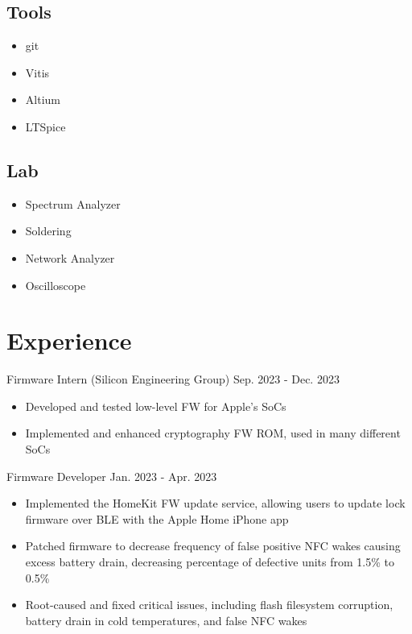 \documentclass[lighthipster]{styles}
\begin{document}
\begin{paracol}{2}
{\subsection*{Tools}
\vspace{-0.2cm}
\begin{multicols}{2}
    \begin{itemize}
        \item git
        \item Vitis
        \item Altium
        \item LTSpice
    \end{itemize}
\end{multicols}

\subsection*{Lab}
\vspace{-0.2cm}
\begin{multicols}{2}[]
    \begin{itemize}
        \item Spectrum Analyzer
        \item Soldering
        \item Network Analyzer
        \item Oscilloscope
    \end{itemize}
\end{multicols}

}
\switchcolumn

\section*{Experience}

{Firmware Intern (Silicon Engineering Group)}
{Sep. 2023 - Dec. 2023}
\begin{itemize}
    \item Developed and tested low-level FW for Apple's SoCs
    \item Implemented and enhanced cryptography FW ROM, used in many different SoCs
\end{itemize}

{Firmware Developer}
{Jan. 2023 - Apr. 2023}
\begin{itemize}
    \item Implemented the HomeKit FW update service, allowing users to update lock
          firmware over BLE with the Apple Home iPhone app
    \item Patched firmware to decrease frequency of false positive NFC wakes
          causing excess battery drain, decreasing percentage of defective
          units from 1.5\% to 0.5\%
    \item Root-caused and fixed critical issues, including flash filesystem
          corruption, battery drain in cold temperatures, and false NFC wakes
\end{itemize}


\end{paracol}
\end{document}
